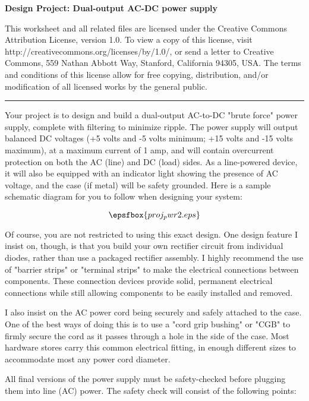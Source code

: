 
\centerline{\bf Design Project: Dual-output AC-DC power supply} \bigskip 
 
This worksheet and all related files are licensed under the Creative Commons Attribution License, version 1.0.  To view a copy of this license, visit http://creativecommons.org/licenses/by/1.0/, or send a letter to Creative Commons, 559 Nathan Abbott Way, Stanford, California 94305, USA.  The terms and conditions of this license allow for free copying, distribution, and/or modification of all licensed works by the general public.

\bigskip 

\hrule

\vskip 10pt

Your project is to design and build a dual-output AC-to-DC "brute force" power supply, complete with filtering to minimize ripple.  The power supply will output balanced DC voltages (+5 volts and -5 volts minimum; +15 volts and -15 volts maximum), at a maximum current of 1 amp, and will contain overcurrent protection on both the AC (line) and DC (load) sides.  As a line-powered device, it will also be equipped with an indicator light showing the presence of AC voltage, and the case (if metal) will be safety grounded.  Here is a sample schematic diagram for you to follow when designing your system:

$$\epsfbox{proj_pwr2.eps}$$

Of course, you are not restricted to using this exact design.  One design feature I insist on, though, is that you build your own rectifier circuit from individual diodes, rather than use a packaged rectifier assembly.  I highly recommend the use of "barrier strips" or "terminal strips" to make the electrical connections between components.  These connection devices provide solid, permanent electrical connections while still allowing components to be easily installed and removed.

I also insist on the AC power cord being securely and safely attached to the case.  One of the best ways of doing this is to use a "cord grip bushing" or "CGB" to firmly secure the cord as it passes through a hole in the side of the case.  Most hardware stores carry this common electrical fitting, in enough different sizes to accommodate most any power cord diameter.

All final versions of the power supply must be safety-checked before plugging them into line (AC) power.  The safety check will consist of the following points:

